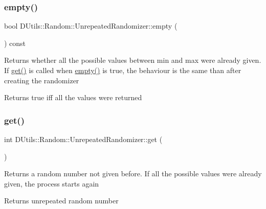 \subsubsection{\texorpdfstring{empty()}{empty()}}
{\footnotesize\ttfamily bool D\+Utils\+::\+Random\+::\+Unrepeated\+Randomizer\+::empty (\begin{DoxyParamCaption}{ }\end{DoxyParamCaption}) const\hspace{0.3cm}{\ttfamily [inline]}}

Returns whether all the possible values between min and max were already given. If \mbox{\hyperlink{class_d_utils_1_1_random_1_1_unrepeated_randomizer_ae1bf6a140e322962f65b2c98dc07a3ac}{get()}} is called when \mbox{\hyperlink{class_d_utils_1_1_random_1_1_unrepeated_randomizer_a4f93a3ab99e3e801d0c1d2599917a37a}{empty()}} is true, the behaviour is the same than after creating the randomizer \begin{DoxyReturn}{Returns}
true iff all the values were returned 
\end{DoxyReturn}
\mbox{\label{class_d_utils_1_1_random_1_1_unrepeated_randomizer_ae1bf6a140e322962f65b2c98dc07a3ac}} 
\subsubsection{\texorpdfstring{get()}{get()}}
{\footnotesize\ttfamily int D\+Utils\+::\+Random\+::\+Unrepeated\+Randomizer\+::get (\begin{DoxyParamCaption}{ }\end{DoxyParamCaption})}

Returns a random number not given before. If all the possible values were already given, the process starts again \begin{DoxyReturn}{Returns}
unrepeated random number 
\end{DoxyReturn}
\mbox{\label{class_d_utils_1_1_random_1_1_unrepeated_randomizer_a8ba0925ac2e14881505a9575466ddc4f}} 
